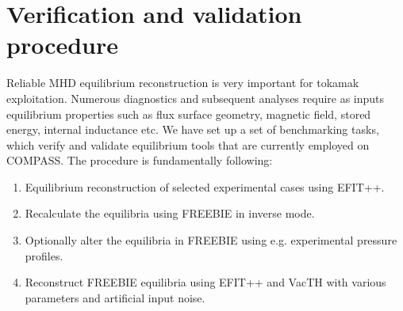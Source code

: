 
\section{Verification and validation procedure} %
\label{sec:procedure}

Reliable MHD equilibrium reconstruction is very important for tokamak exploitation. Numerous diagnostics and subsequent analyses require as inputs equilibrium properties such as flux surface geometry, magnetic field, stored energy, internal inductance etc. We have set up a set of benchmarking tasks, which verify and validate equilibrium tools that are currently employed on COMPASS. The procedure is fundamentally following:

\begin{enumerate}
	\item Equilibrium reconstruction of selected experimental cases using EFIT++.
	\item Recalculate the equilibria using FREEBIE in inverse mode.
	\item Optionally alter the equilibria in FREEBIE using e.g. experimental pressure profiles.
	\item Reconstruct FREEBIE equilibria using EFIT++ and VacTH with various parameters and artificial input noise.
\end{enumerate}

